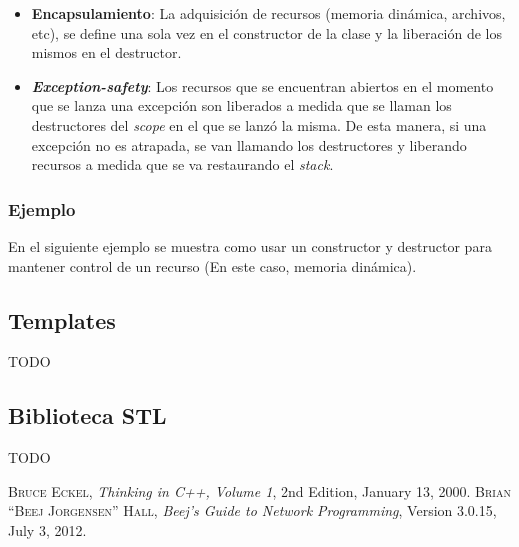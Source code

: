 \documentclass[a4paper, twoside]{article}
\newcommand{\codedir}{../resources/code} %
\begin{document}
\begin{itemize}
	\item \textbf{Encapsulamiento}: La adquisición de recursos (memoria dinámica, archivos, etc), se define una sola vez en el constructor de la clase y la liberación de los mismos en el destructor.
	\item \emph{\textbf{Exception-safety}}: Los recursos que se encuentran abiertos en el momento que se lanza una excepción son liberados a medida que se llaman los destructores del \emph{scope} en el que se lanzó la misma. De esta manera, si una excepción no es atrapada, se van llamando los destructores y liberando recursos a medida que se va restaurando el \emph{stack}.
\end{itemize}

\newpage
\subsubsection{Ejemplo}
En el siguiente ejemplo se muestra como usar un constructor y destructor para mantener control de un recurso (En este caso, memoria dinámica).



\subsection{Templates}
TODO %

\subsection{Biblioteca STL}
TODO %

\newpage
\newcommand{\bibliographyname}{Bibliografía} %
\addcontentsline{toc}{section}{\bibliographyname} %
\renewcommand\refname{\bibliographyname} %
\begin{thebibliography}{X}
	 \textsc{Bruce Eckel}, \textit{Thinking in C++, Volume 1}, 2nd Edition, January 13, 2000.
	 \textsc{Brian “Beej Jorgensen” Hall}, \textit{Beej's Guide to Network Programming}, Version 3.0.15, July 3, 2012.
\end{thebibliography}

\makeseccioncolaboradores %

\makehistorial
\end{document}
